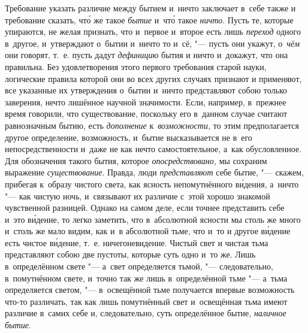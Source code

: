 Требование указать различие между бытием и~ничто заключает в~себе также и
требование сказать, чт\'{о} же такое {\em бытие} и~чт\'{о} такое {\em ничто}.
Пусть те, которые упираются, не желая признать, что и~первое и~второе есть лишь
{\em переход} одного в~другое, и~утверждают о~бытии и~ничто то и~сё, "--- пусть
они укажут, о~{\em чём} они говорят, т.~е. пусть дадут {\em дефиницию} бытия и
ничто и~докажут, что она правильна. Без удовлетворения этого первого требования
старой науки, логические правила которой они во всех других случаях признают и
применяют, все указанные их утверждения о~бытии и~ничто представляют собою
только заверения, нечто лишённое научной значимости. Если, например, в~прежнее
время говорили, что существование, поскольку его в~данном случае считают
равнозначным бытию, есть {\em дополнение} к~{\em возможности,} то этим
предполагается другое определение, возможность, и~бытие высказывается не в~его
непосредственности и~даже не как нечто самостоятельное, а~как обусловленное.
Для обозначения такого бытия, которое {\em опосредствовано,} мы сохраним
выражение {\em существование}. Правда, люди {\em представляют} себе бытие, "---
скажем, прибегая к~образу чистого света, как ясность непомутнённого
в\'{и}дения, а~ничто "--- как чистую ночь, и~связывают их различие с~этой
хорошо знакомой чувственной разницей. Однако на самом деле, если точнее
представить себе и~это в\'{и}дение, то легко заметить, что в~абсолютной ясности
мы столь же много и~столь же мало видим, как и~в абсолютной тьме, что и~то и
другое в\'{и}дение есть чистое в\'{и}дение, т.~е. ничегоневидение. Чистый свет
и чистая тьма представляют собою две пустоты, которые суть одно и~то же. Лишь
в~определённом свете "--- а~свет определяется тьмой, "--- следовательно,
в~помутнённом свете, и~точно так же лишь в~определённой тьме "--- а~тьма
определяется светом, "--- в~освещённой тьме получается впервые возможность
что-то различать, так как лишь помутнённый свет и~освещённая тьма имеют
различие в~самих себе и, следовательно, суть определённое бытие,
{\em наличное бытие}.


